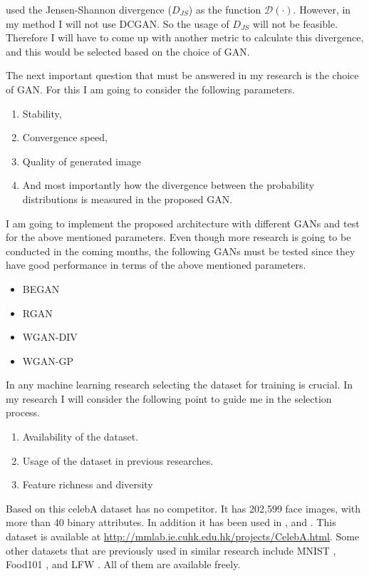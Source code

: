 \documentclass[../main/main.tex]{subfiles}
\begin{document}
	\cite{Zhang2019} used the Jensen-Shannon divergence ($D_{JS}$) as the function $\mathcal{D}(\cdot)$. However, in my method I will not use \gls{DCGAN}. So the usage of $D_{JS}$ will not be feasible. Therefore I will have to come up with another metric to calculate this divergence, and this would be selected based on the choice of \gls{GAN}.  
	
	The next important question that must be answered in my research is the choice of \gls{GAN}. For this I am going to consider the following parameters. 
	\begin{enumerate}
		\item Stability,
		\item Convergence speed,
		\item Quality of  generated image 
		\item And most importantly how the divergence between the probability distributions is measured in the proposed \gls{GAN}.
	\end{enumerate}

	I am going to implement the proposed architecture with different \gls{GAN}s and test for the above mentioned parameters. Even though more research is going to be conducted in the coming months, the following \gls{GAN}s must be tested since they have good performance in terms of the above mentioned parameters. 
	\begin{itemize}
		\item \gls{BEGAN} \cite{berthelot2017began} 
		\item \gls{RGAN} \cite{jolicoeur2018relativistic}
		\item  \gls{WGAN-DIV} \cite{wu2018wasserstein}
		\item \gls{WGAN-GP} \cite{gulrajani2017improved}
	\end{itemize}

	In any machine learning research selecting the dataset for training is crucial. In my research I will consider the following point to guide me in the selection process. 
	
	\begin{enumerate}
		\item Availability of the dataset.
		\item Usage of the dataset in previous researches.
		\item Feature richness and diversity
	\end{enumerate}
	Based on this celebA \cite{liu2015faceattributes} dataset has no competitor.  It has 202,599 face images, with more than 40 binary attributes. In addition it has been used in \cite{Zhang2019}, \cite{Hu2018} and \cite{Ke}. This dataset is available at \url{http://mmlab.ie.cuhk.edu.hk/projects/CelebA.html}. Some other datasets that are previously used in similar research include MNIST \cite{mnist}, Food101 \cite{bossard14}, and LFW \cite{LFWTech}. All of them are available freely. 
	
\end{document}
